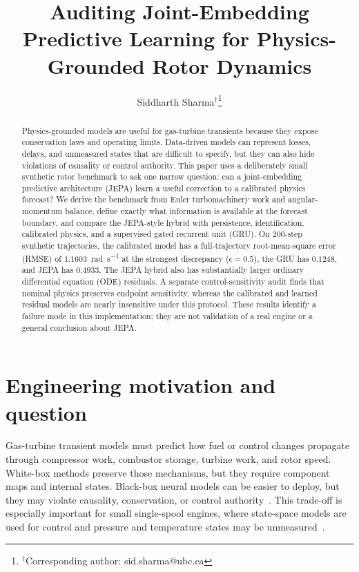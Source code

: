\documentclass[10pt,journal]{IEEEtran}
\title{Auditing Joint-Embedding Predictive Learning for Physics-Grounded Rotor Dynamics}
\author{Siddharth Sharma$^{\dagger}$\thanks{$^{\dagger}$Corresponding author: sid.sharma@ubc.ca}}
\begin{document}
\maketitle

\begin{abstract}
Physics-grounded models are useful for gas-turbine transients because they expose conservation laws and operating limits. Data-driven models can represent losses, delays, and unmeasured states that are difficult to specify, but they can also hide violations of causality or control authority. This paper uses a deliberately small synthetic rotor benchmark to ask one narrow question: can a joint-embedding predictive architecture (JEPA) learn a useful correction to a calibrated physics forecast? We derive the benchmark from Euler turbomachinery work and angular-momentum balance, define exactly what information is available at the forecast boundary, and compare the JEPA-style hybrid with persistence, identification, calibrated physics, and a supervised gated recurrent unit (GRU). On 200-step synthetic trajectories, the calibrated model has a full-trajectory root-mean-square error (RMSE) of $1.1603$~\si{\radian\per\second} at the strongest discrepancy ($\epsilon=0.5$), the GRU has $0.1248$, and JEPA has $0.4933$. The JEPA hybrid also has substantially larger ordinary differential equation (ODE) residuals. A separate control-sensitivity audit finds that nominal physics preserves endpoint sensitivity, whereas the calibrated and learned residual models are nearly insensitive under this protocol. These results identify a failure mode in this implementation; they are not validation of a real engine or a general conclusion about JEPA.
\end{abstract}

\section{Engineering motivation and question}
Gas-turbine transient models must predict how fuel or control changes propagate through compressor work, combustor storage, turbine work, and rotor speed. White-box methods preserve those mechanisms, but they require component maps and internal states. Black-box neural models can be easier to deploy, but they may violate causality, conservation, or control authority~\cite{yang2024transient,shehata2024microturbojet}. This trade-off is especially important for small single-spool engines, where state-space models are used for control and pressure and temperature states may be unmeasured~\cite{beneda2018spool}.
\end{document}
